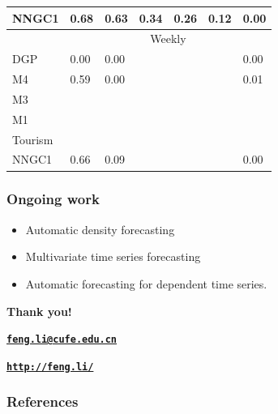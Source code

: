 \documentclass[10pt,aspectratio=43]{beamer}
\begin{document}
\begin{frame}
\begin{table}[!thb]
{\begin{tabular}{p{2cm}p{1.5cm}p{1.5cm}p{1.5cm}p{1.5cm}p{1.5cm}p{1.5cm}}
        NNGC1 & 0.68 & 0.63 & 0.34 & 0.26 & 0.12 & 0.00 \\
        \midrule
                  & \multicolumn{6}{c}{Weekly}\\
        DGP & 0.00 & 0.00 &  &  &  & 0.00 \\
        M4 & 0.59 & 0.00 &  &  &  & 0.01 \\
        M3 &  &  &  &  &  &  \\
        M1 &  &  &  &  &  &  \\
        Tourism &  &  &  &  &  &  \\
        NNGC1 & 0.66 & 0.09 &  &  &  & 0.00 \\
        \bottomrule
      \end{tabular}
    }%
    \label{table:miscoverage}
  \end{table}




\end{frame}

\begin{frame}
  \frametitle{Ongoing work}

  \begin{itemize}
  \item Automatic density forecasting
  \item Multivariate time series forecasting
  \item Automatic forecasting for dependent time series.
  \end{itemize}

\end{frame}
\begin{frame}[plain]
  \addtocounter{framenumber}{-1}
  \begin{center}
    {\color{SUblue} \textbf{\Huge Thank you!}}
    \vspace{1cm}

    {\texttt{\textbf{\url{feng.li@cufe.edu.cn}}}}

    \vspace{1cm}

    {\texttt{\textbf{\url{http://feng.li/}}}}

  \end{center}
\end{frame}

\begin{frame}[allowframebreaks]
  \frametitle{References}


\end{frame}
\end{document}
